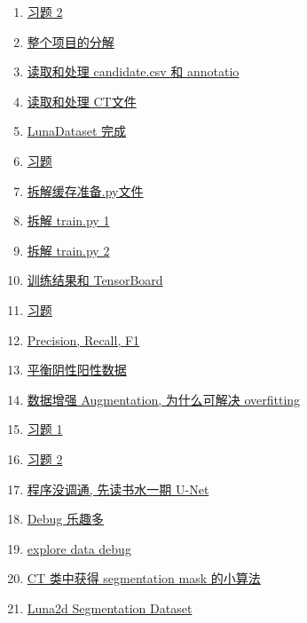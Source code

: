 \documentclass[11pt]{article}
\begin{document}
\begin{multicols}{2}
\begin{enumerate}
		\item \href{https://mp.weixin.qq.com/s/HGkmnYuPl36cZTGFYCu8fQ}{习题 2}	%
		\item \href{https://mp.weixin.qq.com/s/Ymay8JW_txqqLZHmR2w5Rw}{整个项目的分解}	%
		\item \href{https://mp.weixin.qq.com/s/2ITdHjl3pE1MbkwrP_0h9A}{读取和处理 candidate.csv 和 annotatio}	%
		\item \href{https://mp.weixin.qq.com/s/Th8JZrmaD2LEUKx08YQlvw}{读取和处理 CT文件}	%
		\item \href{https://mp.weixin.qq.com/s/lIzTsdNRAcOUwMsjzdne_Q}{LunaDataset 完成}	%
		\item \href{https://mp.weixin.qq.com/s/0PRdfoS_JFB1Q1FrKekrrg}{习题}	%
		\item \href{https://mp.weixin.qq.com/s/nHCuviWnYNLiOa0FfnJOEA}{拆解缓存准备.py文件}	%
		\item \href{https://mp.weixin.qq.com/s/FOwuu0XcUOSJ2apWjFVwsg}{拆解 train.py 1}	%
		\item \href{https://mp.weixin.qq.com/s/x7z3bPo4ozUAlyPyYAJbGQ}{拆解 train.py 2}	%
		\item \href{https://mp.weixin.qq.com/s/H4cwFWNLjZb3WZHuTQzuyg}{训练结果和 TensorBoard}	%
		\item \href{https://mp.weixin.qq.com/s/xyQoo7qDBxN_Zk8Wt1FElQ}{习题}	%
		\item \href{https://mp.weixin.qq.com/s/OqJ-vUynfT5xhSqPDtE2Dw}{Precision, Recall, F1}	%
		\item \href{https://mp.weixin.qq.com/s/gUEClB605k4iz6YbxgEXhQ}{平衡阴性阳性数据}	%
		\item \href{https://mp.weixin.qq.com/s/qqZOqRp-Urn11w8IvmXufw}{数据增强 Augmentation, 为什么可解决 overfitting}	%
		\item \href{https://mp.weixin.qq.com/s/KTbE3D77ytEA199gVcLuXg}{习题 1}	%
		\item \href{https://mp.weixin.qq.com/s/xs18IxlwNQI1EBXU6E6BmQ}{习题 2}	%
		\item \href{https://mp.weixin.qq.com/s/J1qWWp5EMnlKmGKHd7FOpQ}{程序没调通, 先读书水一期 U-Net}	%
		\item \href{https://mp.weixin.qq.com/s/1Ik9lzNetz8-9rkNC214ew}{Debug 乐趣多}	%
		\item \href{https://mp.weixin.qq.com/s/br9IxnOfIxSkEHM0FPycsQ}{explore data debug}	%
		\item \href{https://mp.weixin.qq.com/s/Ua2lGl55RXBm70UQwTv5eQ}{CT 类中获得 segmentation mask 的小算法}	%
		\item \href{https://mp.weixin.qq.com/s/1OjKDD8oJY0sI6kAERE10A}{Luna2d Segmentation Dataset}	%

\end{enumerate}
\end{multicols}
\end{document}
